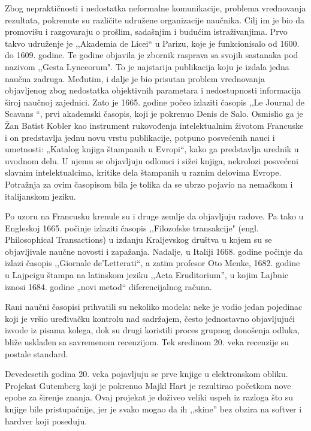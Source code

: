 \documentclass[12pt,a4paper]{article}
\begin{document}
   Zbog nepraktičnosti i nedostatka neformalne komunikacije, problema vrednovanja rezultata, pokrenute su različite udružene organizacije naučnika. Cilj im je bio da promovišu i razgovaraju o prošlim, sadašnjim i budućim istraživanjima. Prvo takvo udruženje je ,,Akademia de Licei“ u Parizu, koje je funkcionisalo od 1600. do 1609. godine. Te godine objavila je zbornik rasprava sa svojih sastanaka pod nazivom ,,Gesta Lynceorum". To je najstarija publikacija koju je izdala jedna naučna zadruga. Međutim, i dalje je bio prisutan problem vrednovanja objavljenog zbog nedostatka objektivnih parametara i nedostupnosti informacija široj naučnoj zajednici. Zato je 1665. godine počeo izlaziti časopis ,,Le Journal de Scavans “, prvi akademski časopis, koji je pokrenuo Denis de Salo. Osmislio ga je Žan Batist Kobler kao instrument rukovođenja intelektualnim životom Francuske i on predstavlja jednu novu vrstu publikacije, potpuno posvećenih nauci i umetnosti: „Katalog knjiga štampanih u Evropi“, kako ga predstavlja urednik u uvodnom delu. U njemu se objavljuju odlomci i sižei knjiga, nekrolozi posvećeni slavnim intelektualcima, kritike dela štampanih u raznim delovima Evrope. Potražnja za ovim časopisom bila je tolika da se ubrzo pojavio na nemačkom i italijanskom jeziku. \cite{1}
   
   Po uzoru na Francusku krenule su i druge zemlje da objavljuju radove. Pa tako u Engleskoj 1665. počinje izlaziti časopis ,,Filozofske transakcije" (engl. Philosophical Transactions) u izdanju Kraljevskog društva u kojem su se objavljivale naučne novosti i zapažanja. Nadalje, u Italiji 1668. godine počinje da izlazi časopis ,,Giornale de'Letterati“, a zatim profesor Oto Menke, 1682. godine u Lajpcigu štampa na latinskom jeziku ,,Acta Eruditorium”, u kojim Lajbnic iznosi 1684. godine „novi metod“ diferencijalnog računa.   \cite{1}
   
   Rani naučni časopisi prihvatili su nekoliko modela: neke je vodio jedan pojedinac koji je vršio uređivačku kontrolu nad sadržajem, često jednostavno objavljujući izvode iz pisama kolega, dok su drugi koristili proces grupnog donošenja odluka, bliže usklađen sa savremenom recenzijom. Tek sredinom 20. veka recenzije su postale standard.
   
   Devedesetih godina 20. veka pojavljuju se prve knjige u elektronskom obliku. Projekat Gutemberg koji je pokrenuo Majkl Hart je rezultirao početkom nove epohe za širenje znanja. Ovaj projekat je doživeo veliki uspeh iz razloga što su knjige bile pristupačnije, jer je svako mogao da ih ,,skine” bez obzira na softver i hardver koji poseduju. 
  
\end{document}
